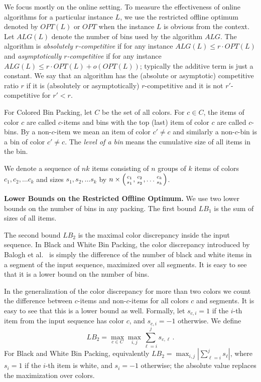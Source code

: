 \documentclass[11pt,a4paper]{article}
\def\vari#1{\mathit{#1}}
\newcommand*{\nolinefrac}[2]{\genfrac{}{}{0pt}{1}{#1}{#2}}
\begin{document}
We focus mostly on the online setting.  To measure the effectiveness
of online algorithms for a particular instance $L$, we use the
restricted offline optimum denoted by $\vari{OPT}(L)$ or $\vari{OPT}$
when the instance $L$ is obvious from the context.  Let
$\vari{ALG}(L)$ denote the number of bins used by the algorithm
$\vari{ALG}$.  The algorithm is \textit{absolutely $r$-competitive} if
for any instance $\vari{ALG}(L)\leq r\cdot{\vari{OPT}(L)}$ and
\textit{asymptotically $r$-competitive} if for any instance
$\vari{ALG}(L)\leq r\cdot{\vari{OPT}(L)}+o(\vari{OPT}(L))$;
typically the additive term is just a constant.  We say that an
algorithm has the (absolute or asymptotic) competitive ratio $r$
if it is (absolutely or asymptotically) $r$-competitive and it is
not $r'$-competitive for $r'<r$.

For Colored Bin Packing, let $C$ be the set of all colors. For $c \in
C$, the items of color $c$ are called $c$-items and bins with the top (last)
item of color $c$ are called $c$-bins. By a non-$c$-item we mean an item of
color $c'\neq c$ and similarly a non-$c$-bin is a bin of 
color $c'\neq c$.  The \textit{level of a bin} means the cumulative size
of all items in the bin.

We denote a sequence of $nk$ items consisting of $n$ groups of $k$ items of colors $c_1, c_2, \dots c_k$ and sizes
$s_1, s_2, \dots s_k$ by $n \times \left( \nolinefrac{c_1}{s_1}, \nolinefrac{c_2}{s_2}, \dots \nolinefrac{c_k}{s_k} \right)$.

\medskip

\textbf{Lower Bounds on the Restricted Offline Optimum.}
We use two lower bounds on the number of bins in any packing. The first bound
$\vari{LB_1}$ is the sum of sizes of all items.

The second bound $\vari{LB_2}$ is the maximal color discrepancy inside
the input sequence.  In Black and White Bin Packing, the color
discrepancy introduced by Balogh et al.~\cite{balogh14} is simply the
difference of the number of black and white items in a segment of
the input sequence, maximized over all segments.  It is easy to see that
it is a lower bound on the number of bins.

In the generalization of the color discrepancy for more than two colors we
count the difference between $c$-items and non-$c$-items for all
colors $c$ and segments. It is easy to see that this is a lower bound
as well. Formally, let $s_{c,i}=1$ if the $i$-th item from the input
sequence has color $c$, and $s_{c,i}=-1$ otherwise. We define
\[
\vari{LB_2} = \max_{c \in C} \max_{i, j} \sum_{\ell=i}^{j}
s_{c,\ell}\,.
\]
For Black and White Bin Packing, equivalently 
$\vari{LB_2} = \max_{i, j} \left| \sum_{\ell=i}^{j} s_\ell \right|$,
where $s_i=1$ if the $i$-th item is white, and $s_i=-1$ otherwise; the
absolute value replaces the maximization over colors.
\end{document}

